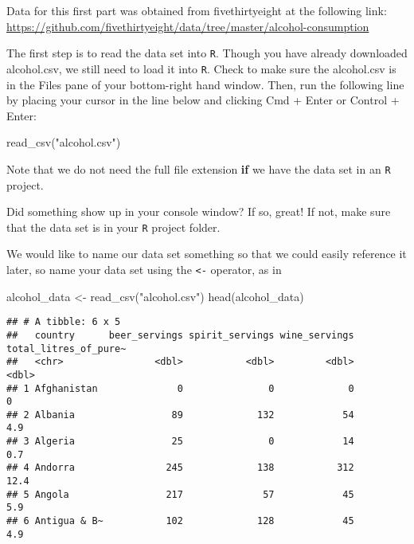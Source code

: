 \documentclass[
]{book}
\newenvironment{Shaded}{\begin{snugshade}}{\end{snugshade}}
\newcommand{\FunctionTok}[1]{\textcolor[rgb]{0.00,0.00,0.00}{#1}}
\newcommand{\NormalTok}[1]{#1}
\newcommand{\OtherTok}[1]{\textcolor[rgb]{0.56,0.35,0.01}{#1}}
\newcommand{\StringTok}[1]{\textcolor[rgb]{0.31,0.60,0.02}{#1}}
\begin{document}
Data for this first part was obtained from fivethirtyeight at the following link: \url{https://github.com/fivethirtyeight/data/tree/master/alcohol-consumption}

The first step is to read the data set into \texttt{R}. Though you have already downloaded alcohol.csv, we still need to load it into \texttt{R}. Check to make sure the alcohol.csv is in the Files pane of your bottom-right hand window. Then, run the following line by placing your cursor in the line below and clicking Cmd + Enter or Control + Enter:

\begin{Shaded}
\begin{Highlighting}[]
\FunctionTok{read\_csv}\NormalTok{(}\StringTok{"alcohol.csv"}\NormalTok{)}
\end{Highlighting}
\end{Shaded}

Note that we do not need the full file extension \textbf{if} we have the data set in an \texttt{R} project.

Did something show up in your console window? If so, great! If not, make sure that the data set is in your \texttt{R} project folder.

We would like to name our data set something so that we could easily reference it later, so name your data set using the \texttt{\textless{}-} operator, as in

\begin{Shaded}
\begin{Highlighting}[]
\NormalTok{alcohol\_data }\OtherTok{\textless{}{-}} \FunctionTok{read\_csv}\NormalTok{(}\StringTok{"alcohol.csv"}\NormalTok{)}
\FunctionTok{head}\NormalTok{(alcohol\_data)}
\end{Highlighting}
\end{Shaded}

\begin{verbatim}
## # A tibble: 6 x 5
##   country      beer_servings spirit_servings wine_servings total_litres_of_pure~
##   <chr>                <dbl>           <dbl>         <dbl>                 <dbl>
## 1 Afghanistan              0               0             0                   0  
## 2 Albania                 89             132            54                   4.9
## 3 Algeria                 25               0            14                   0.7
## 4 Andorra                245             138           312                  12.4
## 5 Angola                 217              57            45                   5.9
## 6 Antigua & B~           102             128            45                   4.9
\end{verbatim}
\end{document}
